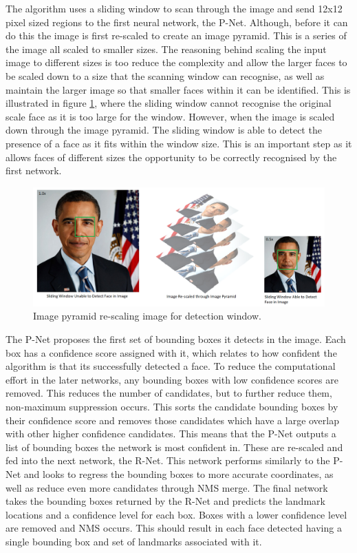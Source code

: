 \documentclass{l4proj}
\begin{document}
The algorithm uses a sliding window to scan through the image and send 12x12 pixel sized regions to the first neural network, the P-Net. Although, before it can do this the image is first re-scaled to create an image pyramid. This is a series of the image all scaled to smaller sizes. The reasoning behind scaling the input image to different sizes is too reduce the complexity and allow the larger faces to be scaled down to a size that the scanning window can recognise, as well as maintain the larger image so that smaller faces within it can be identified. This is illustrated in figure \ref{ip}, where the sliding window cannot recognise the original scale face as it is too large for the window. However, when the image is scaled down through the image pyramid. The sliding window is able to detect the presence of a face as it fits within the window size. This is an important step as it allows faces of different sizes the opportunity to be correctly recognised by the first network. 
\begin{figure}[h!]
  \centering
  \begin{minipage}{0.9\textwidth}
    \includegraphics[width=\textwidth]{images/ip_better.PNG}
    \caption{Image pyramid re-scaling image for detection window.}
    \label{ip}
  \end{minipage}
  \hfill
\end{figure}

The P-Net proposes the first set of bounding boxes it detects in the image. Each box has a confidence score assigned with it, which relates to how confident the algorithm is that its successfully detected a face. To reduce the computational effort in the later networks, any bounding boxes with low confidence scores are removed. This reduces the number of candidates, but to further reduce them, non-maximum suppression occurs. This sorts the candidate bounding boxes by their confidence score and removes those candidates which have a large overlap with other higher confidence candidates. This means that the P-Net outputs a list of bounding boxes the network is most confident in. These are re-scaled and fed into the next network, the R-Net. This network performs similarly to the P-Net and looks to regress the bounding boxes to more accurate coordinates, as well as reduce even more candidates through NMS merge. The final network takes the bounding boxes returned by the R-Net and predicts the landmark locations and a confidence level for each box. Boxes with a lower confidence level are removed and NMS occurs. This should result in each face detected having a single bounding box and set of landmarks associated with it.
\end{document}
